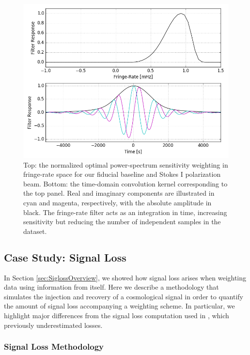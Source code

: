 \documentclass[preprint2,numberedappendix,tighten]{aastex6}  %
\begin{document}
\begin{figure}
	\centering
	\includegraphics[width=\columnwidth]{plots/frp.png}
	\caption{Top: the normalized optimal power-spectrum sensitivity weighting in fringe-rate space for our fiducial baseline and Stokes I polarization beam. Bottom: the time-domain convolution kernel corresponding to the top panel. Real and imaginary components are illustrated in cyan and magenta, respectively, with the absolute amplitude in black. The fringe-rate filter acts as an integration in time, increasing sensitivity but reducing the number of independent samples in the dataset.}
	\label{fig:frp}
\end{figure}


\subsection{Case Study: Signal Loss}
\label{sec:Sigloss}

In Section \ref{sec:SiglossOverview}, we showed how signal loss arises when weighting data using information from itself. Here we describe a methodology that simulates the injection and recovery of a cosmological signal in order to quantify the amount of signal loss accompanying a weighting scheme. In particular, we highlight major differences from the signal loss computation used in \citet{ali_et_al2015}, which previously underestimated losses. 

\subsubsection{Signal Loss Methodology} 
\end{document}
